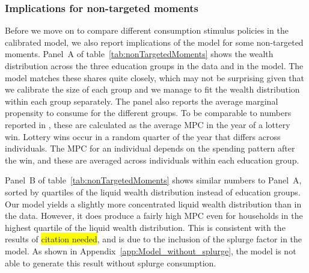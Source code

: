 \documentclass[\econtexRoot/HAFiscal]{subfiles}
\begin{document}
\hypertarget{non-targeted-moments}{}\par\subsubsection{Implications for non-targeted moments} 
\notinsubfile{\label{sec:nonTargetedMoments}}

Before we move on to compare different consumption stimulus policies in the calibrated model, we also report implications of the model for some non-targeted moments.
Panel~A of table~\ref{tab:nonTargetedMoments} shows the wealth distribution across the three education groups in the data and in the model.
The model matches these shares quite closely, which may not be surprising given that we calibrate the size of each group and we manage to fit the wealth distribution within each group separately.
The panel also reports the average marginal propensity to consume for the different groups.
To be comparable to numbers reported in \citet{fagereng_mpc_2021}, these are calculated as the average MPC in the year of a lottery win.
Lottery wins occur in a random quarter of the year that differs across individuals.
The MPC for an individual depends on the spending pattern after the win, and these are averaged across individuals within each education group.


Panel~B of table~\ref{tab:nonTargetedMoments} shows similar numbers to Panel~A, sorted by quartiles of the liquid wealth distribution instead of education groups.
Our model yields a slightly more concentrated liquid wealth distribution than in the data.
However, it does produce a fairly high MPC even for households in the highest quartile of the liquid wealth distribution.
This is consistent with the results of \colorbox{yellow}{citation needed}, and is due to the inclusion of the splurge factor in the model.
As shown in Appendix~\ref{app:Model_without_splurge}, the model is not able to generate this result without splurge consumption.
\end{document}
